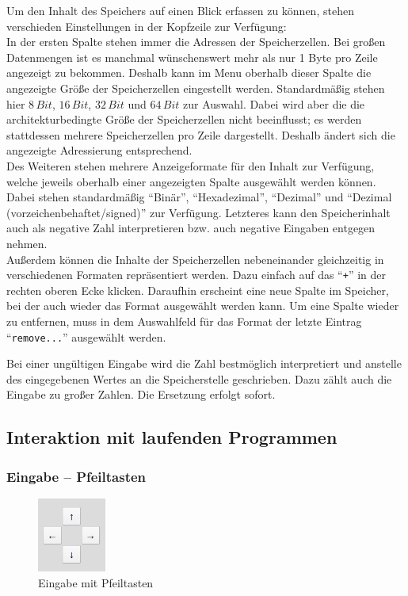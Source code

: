 Um den Inhalt des Speichers auf einen Blick erfassen zu können, stehen verschieden Einstellungen in der Kopfzeile zur Verfügung:\\
In der ersten Spalte stehen immer die Adressen der Speicherzellen. 
Bei großen Datenmengen ist es manchmal wünschenswert mehr als nur 1 Byte pro Zeile angezeigt zu bekommen.
Deshalb kann im Menu oberhalb dieser Spalte die angezeigte Größe der Speicherzellen eingestellt werden.
Standardmäßig stehen hier $8\, Bit$, $16\, Bit$, $32\, Bit$ und $64\, Bit$ zur Auswahl. 
Dabei wird aber die die architekturbedingte Größe der Speicherzellen nicht beeinflusst; es werden stattdessen mehrere Speicherzellen pro Zeile dargestellt.
Deshalb ändert sich die angezeigte Adressierung entsprechend.\\
Des Weiteren stehen mehrere Anzeigeformate für den Inhalt zur Verfügung, welche jeweils oberhalb einer angezeigten Spalte ausgewählt werden können.
Dabei stehen standardmäßig ``Binär'', ``Hexadezimal'', ``Dezimal'' und ``Dezimal (vorzeichenbehaftet/signed)'' zur Verfügung. 
Letzteres kann den Speicherinhalt auch als negative Zahl interpretieren bzw. auch negative Eingaben entgegen nehmen. \\
Außerdem können die Inhalte der Speicherzellen nebeneinander gleichzeitig in verschiedenen Formaten repräsentiert werden.
Dazu einfach auf das ``\texttt{+}'' in der rechten oberen Ecke klicken. Daraufhin erscheint eine neue Spalte im Speicher, 
bei der auch wieder das Format ausgewählt werden kann. Um eine Spalte wieder zu entfernen, muss in dem Auswahlfeld für das Format der letzte
Eintrag ``\texttt{remove...}'' ausgewählt werden.

\begin{warningblock}
Bei einer ungültigen Eingabe wird die Zahl bestmöglich interpretiert und anstelle des
eingegebenen Wertes an die Speicherstelle geschrieben. Dazu zählt auch die Eingabe zu großer Zahlen.
Die Ersetzung erfolgt sofort.
\end{warningblock}


\subsection{Interaktion mit laufenden Programmen}

\subsubsection{Eingabe -- Pfeiltasten}
\begin{figure}[ht]
	\centering
  \includegraphics[width=0.2\textwidth]{Images/Joystick}
	\caption{Eingabe mit Pfeiltasten}
	\label{Joystick}
\end{figure}


